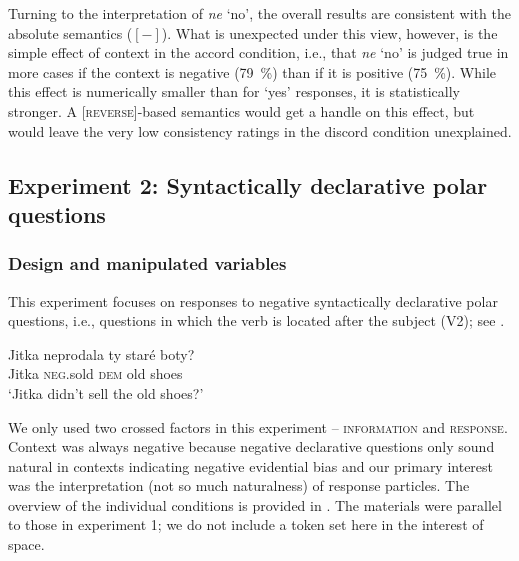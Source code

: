 \documentclass[output=paper,colorlinks,citecolor=brown]{langscibook}
\begin{document}
Turning to the interpretation of \textit{ne} `no', the overall results are consistent with the absolute semantics ($[-]$). What is unexpected under this view, however, is the simple effect of context in the \textsf{accord} condition, i.e., that \textit{ne} `no' is judged true in more cases if the context is negative (\qty{79}{\percent}) than if it is positive (\qty{75}{\percent}). While this effect is numerically smaller than for `yes' responses, it is statistically stronger. A [\textsc{reverse}]-based semantics would get a handle on this effect, but would leave the very low consistency ratings in the \textsf{discord} condition unexplained.

\subsection{Experiment 2: Syntactically declarative polar questions}\label{hrdsim:sec:e2}

\subsubsection{Design and manipulated variables}

This experiment focuses on responses to negative syntactically declarative polar questions, i.e., questions in which the verb is located after the subject (V2); see .

\ea \gll Jitka neprodala ty staré boty?\\
Jitka \textsc{neg}.sold \textsc{dem} old shoes\\
\glt `Jitka didn't sell the old shoes?'\label{hrdsim:ex:v2-ex}
\z

\noindent We only used two crossed factors in this experiment -- \textsc{information} and \textsc{response}. Context was always negative because negative declarative questions only sound natural in contexts indicating negative evidential bias \citep{hrd+:Gunlogson2002,Stankova2023} and our primary interest was the interpretation (not so much naturalness) of response particles. The overview of the individual conditions is provided in . The materials were parallel to those in experiment 1; we do not include a token set here in the interest of space.
\end{document}
